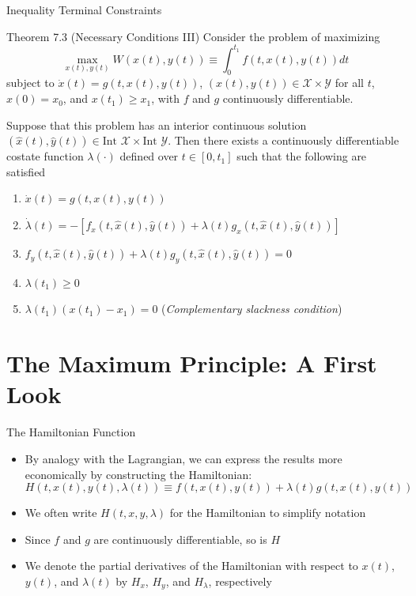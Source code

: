 \documentclass[9pt,aspectratio=169]{beamer}
\newcommand{\X}{\mathcal{X}}
\newcommand{\Y}{\mathcal{Y}}
\begin{document}
\begin{frame}{Inequality Terminal Constraints}
    \begin{block}{Theorem 7.3 (Necessary Conditions III)}
        Consider the problem of maximizing
        \begin{equation*}
            \max_{x(t),y(t)} W(x(t), y(t)) \equiv \int_0^{t_1} f(t, x(t),
            y(t))dt
        \end{equation*}
        subject to $\dot{x}(t) = g(t, x(t), y(t))$, $(x(t), y(t)) \in \X
        \times \Y$ for all $t$, $x(0) = x_0$, and $x(t_1) \geq x_1$, with $f$
        and $g$ continuously differentiable. 

        Suppose that this problem has an interior continuous solution
        $(\hat{x}(t), \hat{y}(t)) \in \text{Int } \X \times \text{Int } \Y$.
        Then there exists a continuously differentiable costate function
        $\lambda(\cdot)$ defined over $t \in [0, t_1]$ such that the
        following are satisfied
        \begin{enumerate}
            \item $\dot{x}(t) = g(t, x(t), y(t))$
            \item $\dot{\lambda}(t) = -[f_x(t, \hat{x}(t), \hat{y}(t)) +
            \lambda(t)g_x(t, \hat{x}(t), \hat{y}(t))]$
            \item $f_y(t, \hat{x}(t), \hat{y}(t)) + \lambda(t)g_y(t,
            \hat{x}(t), \hat{y}(t)) = 0$
            \item $\lambda(t_1) \geq 0$
            \item $\lambda(t_1)(x(t_1) - x_1) = 0$ \quad
            (\emph{Complementary slackness condition})
        \end{enumerate}
    \end{block}
\end{frame}

\section{The Maximum Principle: A First Look}

\begin{frame}{The Hamiltonian Function}
\begin{itemize}
    \item By analogy with the Lagrangian, we can express the results more economically by constructing the Hamiltonian:
    $$H(t, x(t), y(t), \lambda(t)) \equiv f(t, x(t), y(t)) + \lambda(t)g(t, x(t), y(t))$$
    \item We often write $H(t, x, y, \lambda)$ for the Hamiltonian to simplify notation
    \item Since $f$ and $g$ are continuously differentiable, so is $H$
    \item We denote the partial derivatives of the Hamiltonian with respect to $x(t)$, $y(t)$, and $\lambda(t)$ by $H_x$, $H_y$, and $H_\lambda$, respectively
\end{itemize}
\end{frame}
\end{document}

